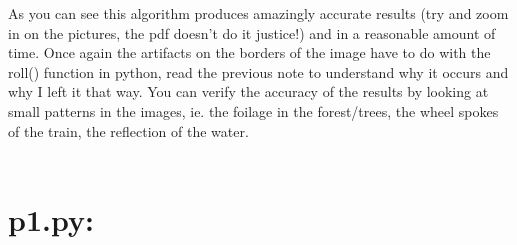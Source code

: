 \documentclass{article}
\begin{document}
\clearpage
As you can see this algorithm produces amazingly accurate results (try and zoom in on the pictures, the pdf doesn't do it justice!) and in a reasonable amount of time. Once again the artifacts on the borders of the image have to do with the roll() function in python, read the previous note to understand why it occurs and why I left it that way. You can verify the accuracy of the results by looking at small patterns in the images, ie. the foilage in the forest/trees, the wheel spokes of the train, the reflection of the water.
\\\\

\section{p1.py:}
\end{document}
